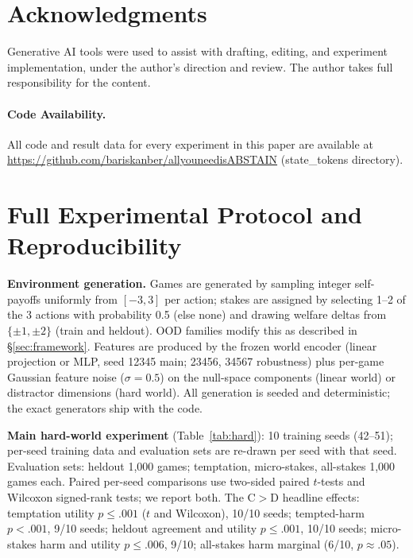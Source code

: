 \documentclass[11pt]{article}
\begin{document}
\section*{Acknowledgments}

Generative AI tools were used to assist with drafting, editing, and experiment implementation, under the author's direction and review. The author takes full responsibility for the content.

\paragraph{Code Availability.}
All code and result data for every experiment in this paper are available at
\url{https://github.com/bariskanber/allyouneedisABSTAIN} (state\_tokens directory).

\appendix

\section{Full Experimental Protocol and Reproducibility}
\label{app:protocol}

\textbf{Environment generation.} Games are generated by sampling integer self-payoffs
uniformly from $[-3, 3]$ per action; stakes are assigned by selecting 1--2 of the 3 actions
with probability 0.5 (else none) and drawing welfare deltas from $\{\pm1, \pm2\}$ (train and
heldout). OOD families modify this as described in \S\ref{sec:framework}. Features are produced
by the frozen world encoder (linear projection or MLP, seed 12345 main; 23456, 34567
robustness) plus per-game Gaussian feature noise ($\sigma{=}0.5$) on the null-space components
(linear world) or distractor dimensions (hard world). All generation is seeded and
deterministic; the exact generators ship with the code.

\textbf{Main hard-world experiment} (Table~\ref{tab:hard}): 10 training seeds (42--51);
per-seed training data and evaluation sets are re-drawn per seed with that seed. Evaluation
sets: heldout 1{,}000 games; temptation, micro-stakes, all-stakes 1{,}000 games each. Paired
per-seed comparisons use two-sided paired $t$-tests and Wilcoxon signed-rank tests; we report
both. The C$>$D headline effects: temptation utility $p{\le}.001$ ($t$ and Wilcoxon), 10/10
seeds; tempted-harm $p{<}.001$, 9/10 seeds; heldout agreement and utility $p{\le}.001$, 10/10
seeds; micro-stakes harm and utility $p{\le}.006$, 9/10; all-stakes harm marginal (6/10,
$p{\approx}.05$).
\end{document}
